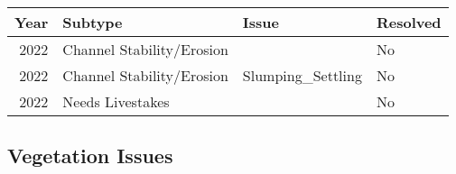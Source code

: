\documentclass[
  landscape]{article}
\begin{document}
\begin{longtable}[]{@{}rlll@{}}
\toprule()
Year & Subtype & Issue & Resolved \\
\midrule()
\endhead
2022 & Channel Stability/Erosion & & No \\
2022 & Channel Stability/Erosion & Slumping\_Settling & No \\
2022 & Needs Livestakes & & No \\
\bottomrule()
\end{longtable}

\newpage

\hypertarget{vegetation-issues}{%
\subsection{Vegetation Issues}\label{vegetation-issues}}
\end{document}
